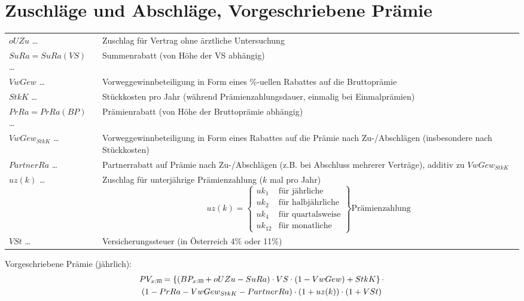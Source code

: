 \documentclass[a4paper,10pt]{article}
\makeatletter
\newcommand{\xn}{{\act[x]{n}}}
\DeclareRobustCommand{\act}[2][]{%
\def\arraystretch{0}%
\setlength\arraycolsep{0.5pt}%
\setlength\arrayrulewidth{0.5pt}%
\setbox0=\hbox{$\scriptstyle#1\ifx#1\empty{asdf}\else:\fi#2$}%
\begin{array}[b]{*2{@{}>{\scriptstyle}c}|}
\cline{2-2}%
\rule[1.25pt]{0pt}{\ht0}%
#1\ifx#1\empty\else:\fi & #2%
\end{array}%
}
\makeatother
\begin{document}
\section{Zuschläge und Abschläge, Vorgeschriebene Prämie}

\begin{longtable}{p{4cm}p{11cm}}
 $oUZu$ \dots & Zuschlag für Vertrag ohne ärztliche Untersuchung\\
 $SuRa=SuRa(VS)$ \dots & Summenrabatt (von Höhe der VS abhängig)\\
 $VwGew$ \dots & Vorweggewinnbeteiligung in Form eines \%-uellen Rabattes auf die Bruttoprämie\\
 $StkK$ \dots & Stückkosten pro Jahr (während Prämienzahlungsdauer, einmalig bei Einmalprämien)\\
 $PrRa=PrRa(BP)$ \dots & Prämienrabatt (von Höhe der Bruttoprämie abhängig)\\
 $VwGew_{StkK}$ \dots & Vorweggewinnbeteiligung in Form eines Rabattes auf die Prämie nach Zu-/Abschlägen (insbesondere nach Stückkosten)\\
 $PartnerRa$ \dots & Partnerrabatt auf Prämie nach Zu-/Abschlägen (z.B. bei Abschluss mehrerer Verträge), additiv zu $VwGew_{StkK}$\\

 $uz(k)$ \dots & Zuschlag für unterjährige Prämienzahlung ($k$ mal pro Jahr)
 \begin{equation*}
  uz(k)=\left.\begin{cases}uk_1 & \text {für jährliche}\\uk_2 & \text {für halbjährliche} \\ uk_4 & \text{für quartalsweise}\\uk_{12} & \text{für monatliche}\end{cases}\right\} \text{Prämienzahlung}
 \end{equation*}\\


 $VSt$ \dots & Versicherungssteuer (in Österreich 4\% oder 11\%) \\

\end{longtable}


Vorgeschriebene Prämie (jährlich):
\begin{multline*}
PV_\xn = \left\{ (BP_\xn + oUZu - SuRa) \cdot VS \cdot (1-VwGew) + StkK\right\} \cdot \\ \left(1-PrRa-VwGew_{StkK}-PartnerRa\right)\cdot \left(1+uz(k)\right) \cdot (1+VSt)
%
\end{multline*}
\end{document}
